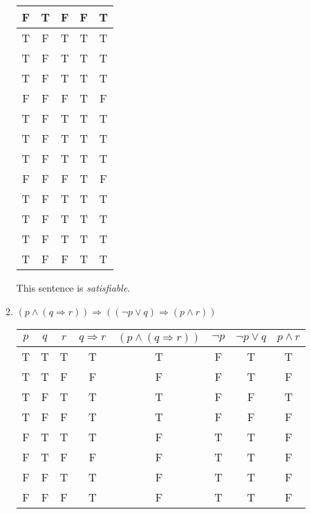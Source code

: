 \documentclass{article}
\begin{document}
\begin{enumerate}
\begin{enumerate}
{\begin{tabular}{|c|c|c|c|c|}
					\hline
					F & T & F & F & T\\
					\hline
					T & F & T & T & T\\
					\hline
					T & F & T & T & T\\
					\hline
					T & F & T & T & T\\
					\hline
					F & F & F & T & F\\
					\hline
					T & F & T & T & T\\
					\hline
					T & F & T & T & T\\
					\hline
					T & F & T & T & T\\
					\hline
					F & F & F & T & F\\
					\hline
					T & F & T & T & T\\
					\hline
					T & F & T & T & T\\
					\hline
					T & F & T & T & T\\
					\hline
					T & F & F & T & T\\
					\hline
				\end{tabular}
			}
			
			This sentence is \emph{satisfiable}.

		\item $(p \wedge ( q \Rightarrow r)) \Rightarrow (( \neg p \vee q) \Rightarrow ( p \wedge r))$
		
			\begin{tabular}{|c|c|c|c|c|c|c|c|}
				\hline
				$p$ & $q$ & $r$ & $q \Rightarrow r$ & $(p \wedge ( q \Rightarrow r))$ & $\neg p$ & $\neg p \vee q$
				& $p \wedge r$\\
				\hline
				T & T & T & T & T & F & T & T\\
				\hline
				T & T & F & F & F & F & T & F\\
				\hline
				T & F & T & T & T & F & F & T\\
				\hline
				T & F & F & T & T & F & F & F\\
				\hline
				F & T & T & T & F & T & T & F\\
				\hline
				F & T & F & F & F & T & T & F\\
				\hline
				F & F & T & T & F & T & T & F\\
				\hline
				F & F & F & T & F & T & T & F\\
				\hline
			\end{tabular}
			

\end{enumerate}
\end{enumerate}
\end{document}
